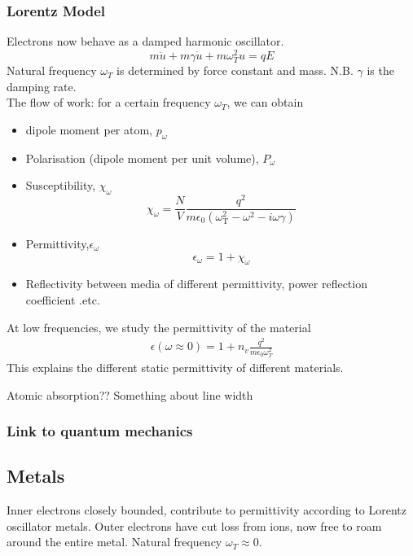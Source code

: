 \documentclass[12pt,a4paper]{article}
\begin{document}
    \subsubsection{Lorentz Model}
        Electrons now behave as a damped harmonic oscillator.\\
        \begin{equation}
            m \ddot{u} + m\gamma\dot{u} + m\omega_T^2 u = qE
        \end{equation}
        Natural frequency $\omega_T$ is determined by force constant and mass.
        N.B. $\gamma$ is the damping rate.\\
        The flow of work: for a certain frequency $\omega_T$, we can obtain
        \begin{itemize}
            \item {dipole moment per atom, $p_\omega$}
            \item {Polarisation (dipole moment per unit volume), $P_\omega$}
            \item {Susceptibility, $\chi_\omega$}
            $$
            \chi_\omega=\frac{N}{V} \frac{q^2}{m \epsilon_0\left(\omega_{\mathrm{T}}^2-\omega^2-i \omega \gamma\right)}
            $$
            \item {Permittivity,$\epsilon_\omega$}
            $$
            \epsilon_\omega=1+\chi_\omega
            $$
            \item {Reflectivity between media of different permittivity, power reflection coefficient .etc.}
        \end{itemize}
        At low frequencies, we study the permittivity of the material
        \begin{align}
            \epsilon (\omega\approx 0) = 1+ n_v \frac{q^2}{m\epsilon_0\omega_T^2}
        \end{align}
        This explains the different static permittivity of different materials.\\
        
        \begin{example}
            {Atomic absorption}{?? Something about line width}
        \end{example}
    \subsubsection{Link to quantum mechanics
    }
        

\subsection{Metals}
    Inner electrons closely bounded, contribute to permittivity according to Lorentz oscillator metals.
    Outer electrons have cut loss from ions, now free to roam around the entire metal.
    Natural frequency $\omega_T \approx 0$.
    
\end{document}
